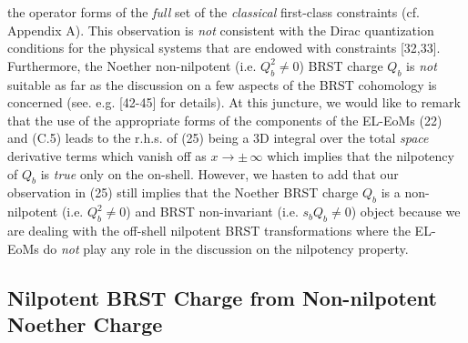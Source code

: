\documentclass[12pt]{article}
\begin{document}
the operator forms of the {\it full} set of the 
 {\it classical} first-class constraints (cf. Appendix A). This observation is {\it not} consistent with the Dirac quantization 
conditions for the physical systems that are endowed with constraints [32,33]. Furthermore, the Noether non-nilpotent 
(i.e. $Q_b^2 \neq 0$) BRST charge $Q_b$
 is {\it not} suitable as far as the discussion on a few aspects of the BRST cohomology is concerned (see. e.g. [42-45] for details). At this juncture,
we would like to remark that the use of the appropriate forms of the components of the EL-EoMs (22) and (C.5) leads to the r.h.s. of (25) being
a 3D integral over the total {\it space} derivative terms which vanish off as $x \to \pm\,\infty$
which implies that the nilpotency of $Q_b$ is {\it true} only on the on-shell. However, we hasten to add that our observation
in (25) still implies that the Noether BRST charge $Q_b$ is a non-nilpotent (i.e. $Q_b^2 \neq 0 $) 
and BRST non-invariant (i.e. $s_b Q_b \neq 0 $)
object because we are dealing with the off-shell nilpotent
BRST transformations where the EL-EoMs do {\it not} play any role in the discussion on the nilpotency property.\\





\subsection{Nilpotent BRST Charge from Non-nilpotent Noether Charge }
\end{document}
